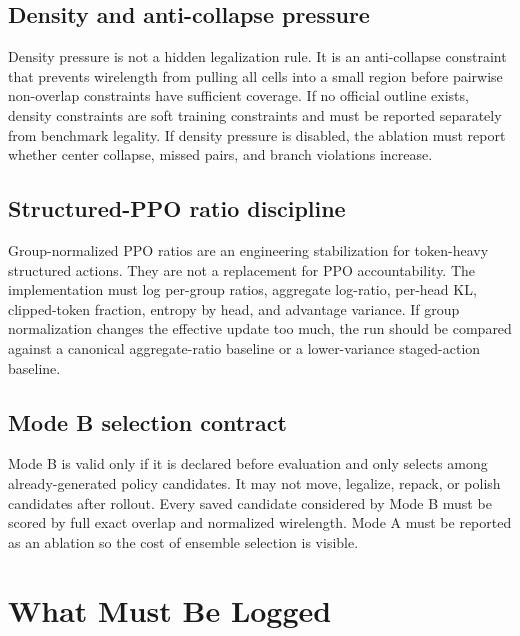 \documentclass[11pt]{article}
\begin{document}
\subsection{Density and anti-collapse pressure}

Density pressure is not a hidden legalization rule. It is an anti-collapse constraint that prevents wirelength from pulling all cells into a small region before pairwise non-overlap constraints have sufficient coverage. If no official outline exists, density constraints are soft training constraints and must be reported separately from benchmark legality. If density pressure is disabled, the ablation must report whether center collapse, missed pairs, and branch violations increase.

\subsection{Structured-PPO ratio discipline}

Group-normalized PPO ratios are an engineering stabilization for token-heavy structured actions. They are not a replacement for PPO accountability. The implementation must log per-group ratios, aggregate log-ratio, per-head KL, clipped-token fraction, entropy by head, and advantage variance. If group normalization changes the effective update too much, the run should be compared against a canonical aggregate-ratio baseline or a lower-variance staged-action baseline.

\subsection{Mode B selection contract}

Mode B is valid only if it is declared before evaluation and only selects among already-generated policy candidates. It may not move, legalize, repack, or polish candidates after rollout. Every saved candidate considered by Mode B must be scored by full exact overlap and normalized wirelength. Mode A must be reported as an ablation so the cost of ensemble selection is visible.

\section{What Must Be Logged}
\end{document}
